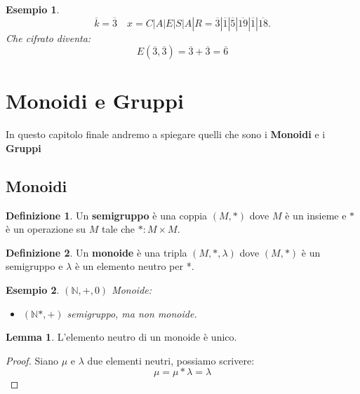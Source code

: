 \documentclass{article}
\newtheorem{exmp}{Esempio}[section]
\theoremstyle{definition}
\newtheorem{definition}{Definizione}[section]
\newtheorem{lemma}{Lemma}[section]
\begin{document}
\begin{exmp}
       \begin{equation*}
               \overline{k} = \overline{3} \quad x = C|A|E|S|A|R = \overline{3}|\overline{1}|\overline{5}|\overline{19}|\overline{1}|\overline{18}.
       \end{equation*}
       Che cifrato diventa:
       \begin{equation*}
               E(\overline{3}, \overline{3}) = \overline{3} + \overline{3} = \overline{6}
       \end{equation*}
\end{exmp}




\newpage
\section{Monoidi e Gruppi}\label{sec:monoidi_e_gruppi}
In questo capitolo finale andremo a spiegare quelli che sono i \textbf{Monoidi} e i \textbf{Gruppi}


\subsection{Monoidi}\label{sec:monoidi}
\begin{definition}
        Un \textbf{semigruppo} è una coppia $(M, *)$ dove $M$ è un insieme e $*$ è un operazione su $M$ tale che $ *: M\times M $. 
\end{definition}
\begin{definition}
       Un \textbf{monoide} è una tripla $ (M, *, \lambda) $ dove $(M, *) $ è un semigruppo e $ \lambda $ è un elemento neutro per *.
\end{definition}

\begin{exmp}
        $  (\mathbb{N},+,0)$ Monoide:
        \begin{itemize}
                \item $(\mathbb{N}*, +)$ semigruppo, ma non monoide.
        \end{itemize}
\end{exmp}

\begin{lemma}
        L'elemento neutro di un monoide è unico.
\end{lemma}
\begin{tcolorbox}
\begin{proof}
       Siano $\mu$ e $ \lambda $ due elementi neutri, possiamo scrivere:
       \begin{equation*}
               \mu = \mu * \lambda = \lambda
       \end{equation*}
\end{proof}
\end{tcolorbox}
\end{document}
